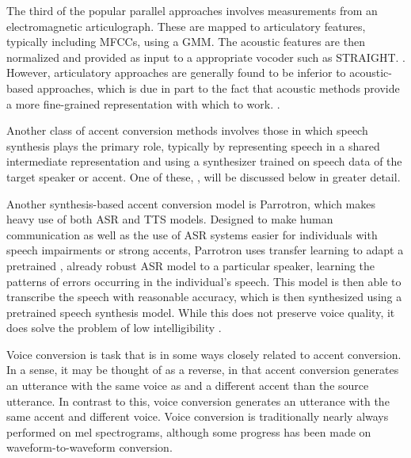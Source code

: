 The third of the popular parallel approaches involves measurements from an electromagnetic 
articulograph. These are mapped to articulatory features, typically including MFCCs, using a GMM.
The acoustic features are then normalized and provided as input to a appropriate vocoder such as STRAIGHT.
\citep{artsynth1}.
However, articulatory approaches are generally found to be inferior to acoustic-based approaches,
which is due in part to the fact that acoustic methods provide a more fine-grained 
representation with which to work.
\citep{artsynth2}.
%


Another class of accent conversion methods involves those in which speech synthesis 
plays the primary role, typically by representing speech in a shared intermediate 
representation and using a synthesizer trained on speech data of the target speaker 
or accent. One of these, \cite{facviappg}, will be discussed below in greater detail.



Another synthesis-based accent conversion model is Parrotron, which makes heavy use 
of both ASR and TTS models. 
Designed to make human communication as well as the use of ASR systems easier for individuals with speech impairments
or strong accents, Parrotron uses transfer learning to adapt a pretrained , already 
robust ASR model to a particular speaker, learning the patterns of errors occurring in 
the individual's speech. This model is then able to transcribe the speech with reasonable accuracy,
which is then synthesized using a pretrained speech synthesis model. While this does 
not preserve voice quality, it does solve the problem of low intelligibility
\cite{parrotron}.



Voice conversion is task that is in some ways closely related to accent conversion.
In a sense, it may be thought of as a reverse, in that accent conversion generates 
an utterance with the same voice as and a different accent than the source utterance.
In contrast to this, voice conversion generates an utterance with the same accent 
and different voice. Voice conversion is traditionally nearly always performed on 
mel spectrograms, although some progress has been made on waveform-to-waveform 
conversion.









